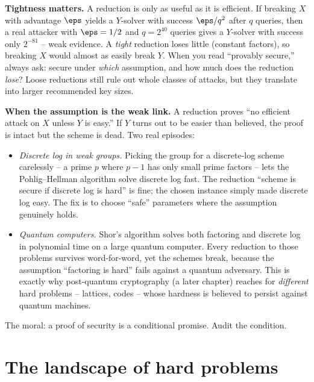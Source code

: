 \begin{focusbox}
\textbf{Tightness matters.} A reduction is only as useful as it is efficient. If breaking $X$ with advantage $\eps$ yields a $Y$-solver with success $\eps/q^{2}$ after $q$ queries, then a real attacker with $\eps=1/2$ and $q=2^{40}$ queries gives a $Y$-solver with success only $2^{-81}$ -- weak evidence. A \emph{tight} reduction loses little (constant factors), so breaking $X$ would almost as easily break $Y$. When you read ``provably secure,'' always ask: secure under \emph{which} assumption, and how much does the reduction \emph{lose}? Loose reductions still rule out whole classes of attacks, but they translate into larger recommended key sizes.
\end{focusbox}

\begin{attackbox}
\textbf{When the assumption is the weak link.} A reduction proves ``no efficient attack on $X$ unless $Y$ is easy.'' If $Y$ turns out to be easier than believed, the proof is intact but the scheme is dead. Two real episodes:
\begin{itemize}
\item \emph{Discrete log in weak groups.} Picking the group for a discrete-log scheme carelessly -- a prime $p$ where $p-1$ has only small prime factors -- lets the Pohlig--Hellman algorithm solve discrete log fast. The reduction ``scheme is secure if discrete log is hard'' is fine; the chosen instance simply made discrete log easy. The fix is to choose ``safe'' parameters where the assumption genuinely holds.
\item \emph{Quantum computers.} Shor's algorithm solves both factoring and discrete log in polynomial time on a large quantum computer. Every reduction to those problems survives word-for-word, yet the schemes break, because the assumption ``factoring is hard'' fails against a quantum adversary. This is exactly why post-quantum cryptography (a later chapter) reaches for \emph{different} hard problems -- lattices, codes -- whose hardness is believed to persist against quantum machines.
\end{itemize}
The moral: a proof of security is a conditional promise. Audit the condition.
\end{attackbox}

\section{The landscape of hard problems}
\label{ch08:landscape}

